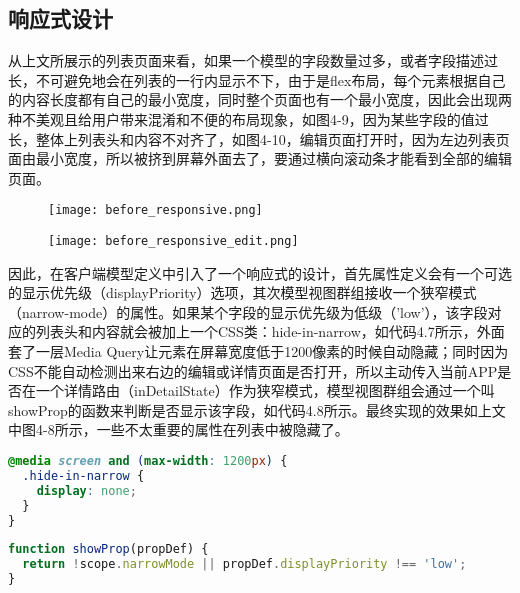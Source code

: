 \subsection{响应式设计}
从上文所展示的列表页面来看，如果一个模型的字段数量过多，或者字段描述过长，不可避免地会在列表的一行内显示不下，由于是flex布局，每个元素根据自己的内容长度都有自己的最小宽度，同时整个页面也有一个最小宽度，因此会出现两种不美观且给用户带来混淆和不便的布局现象，如图4-9，因为某些字段的值过长，整体上列表头和内容不对齐了，如图4-10，编辑页面打开时，因为左边列表页面由最小宽度，所以被挤到屏幕外面去了，要通过横向滚动条才能看到全部的编辑页面。
\begin{figure}[!htp]
 \centering
 \texttt{[image: before\_responsive.png]}
\end{figure}
\begin{figure}[!htp]
 \centering
 \texttt{[image: before\_responsive\_edit.png]}
\end{figure}

因此，在客户端模型定义中引入了一个响应式的设计，首先属性定义会有一个可选的显示优先级（displayPriority）选项，其次模型视图群组接收一个狭窄模式（narrow-mode）的属性。如果某个字段的显示优先级为低级（'low'），该字段对应的列表头和内容就会被加上一个CSS类：hide-in-narrow，如代码4.7所示，外面套了一层Media Query让元素在屏幕宽度低于1200像素的时候自动隐藏；同时因为CSS不能自动检测出来右边的编辑或详情页面是否打开，所以主动传入当前APP是否在一个详情路由（inDetailState）作为狭窄模式，模型视图群组会通过一个叫showProp的函数来判断是否显示该字段，如代码4.8所示。最终实现的效果如上文中图4-8所示，一些不太重要的属性在列表中被隐藏了。
\begin{lstlisting}[language={CSS}, caption={CSS类hide-in-narrow的代码}]
@media screen and (max-width: 1200px) {
  .hide-in-narrow {
    display: none;
  }
}
\end{lstlisting}

\begin{lstlisting}[language={JavaScript}, caption={传感器列表页面中的模型输入群组代码}]
function showProp(propDef) {
  return !scope.narrowMode || propDef.displayPriority !== 'low';
}
\end{lstlisting}
